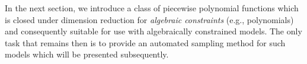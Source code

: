 \documentclass[letterpaper]{article}
\begin{document}
In the next section, we introduce a class of piecewise polynomial functions which is closed under dimension reduction for \emph{algebraic constraints} (e.g., polynomials) and consequently suitable for use with algebraically constrained models. 
The only task that remains then
is to provide an automated sampling method for such models which will be presented subsequently. %
\end{document}
